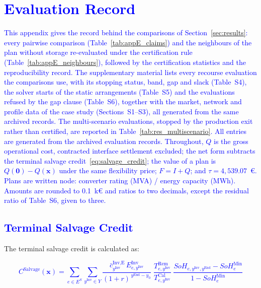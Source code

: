 \documentclass[preprint,12pt]{elsarticle}
\begin{document}
\section{\textcolor{blue}{Evaluation Record}}
\label{app:results}

\textcolor{blue}{
    This appendix gives the record behind the comparisons of Section~\ref{sec:results}: every pairwise comparison (Table~\ref{tab:appE_claims}) and the neighbours of the plan without storage re-evaluated under the certification rule (Table~\ref{tab:appE_neighbours}), followed by the certification statistics and the reproducibility record. The supplementary material lists every recourse evaluation the comparisons use, with its stopping status, band, gap and slack (Table~S4), the solver starts of the static arrangements (Table~S5) and the evaluations refused by the gap clause (Table~S6), together with the market, network and profile data of the case study (Sections~S1--S3), all generated from the same archived records. The multi-scenario evaluations, stopped by the production exit rather than certified, are reported in Table~\ref{tab:res_multiscenario}. All entries are generated from the archived evaluation records. Throughout, $Q$ is the gross operational cost, contracted interface settlement excluded; the net form subtracts the terminal salvage credit~\eqref{eq:salvage_credit}; the value of a plan is $Q(\boldsymbol{0}) - Q(\boldsymbol{x})$ under the same flexibility price; $F = I + Q$; and $\tau = 4{,}539.07$~\euro{}. Plans are written node: converter rating (MVA) / energy capacity (MWh). Amounts are rounded to 0.1~k\euro{} and ratios to two decimals, except the residual ratio of Table~S6, given to three.
}

\subsection{\textcolor{blue}{Terminal Salvage Credit}}
\label{app:salvage_credit}

The terminal salvage credit is calculated as:


\textcolor{blue}{
    \begin{equation}
        C^\text{Salvage}(\boldsymbol{x}) =
        \sum_{e \in E^S} \sum_{y^\text{Inv} \in Y}
        \frac{\bar{c}^{\text{Inv,E}}_{y^\text{Inv}}\, E^{\text{Inv}}_{e,y^\text{Inv}}}{(1+r)^{\,y^\text{End}-y_0}}
        \;\frac{T^\text{Rem}_{e,y^\text{Inv}}}{T^\text{Cal}_{e,y^\text{Inv}}}
        \;\frac{SoH_{e,y^\text{Inv},y^\text{End}} - SoH^{\text{Min}}_e}{1 - SoH^{\text{Min}}_e}
        \label{eq:salvage_credit}
    \end{equation}
}
\end{document}
